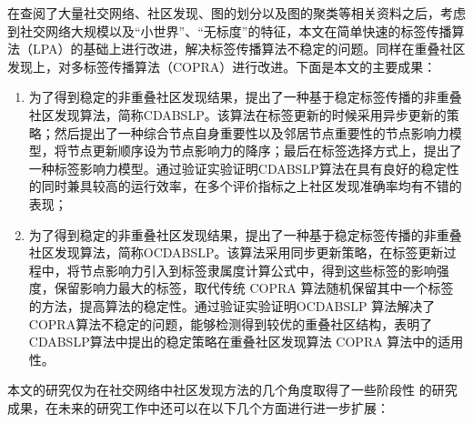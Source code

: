 

\begin{conclusion}


在查阅了大量社交网络、社区发现、图的划分以及图的聚类等相关资料之后，考虑到社交网络大规模以及“小世界”、“无标度”的特征，本文在简单快速的标签传播算法（LPA）的基础上进行改进，解决标签传播算法不稳定的问题。同样在重叠社区发现上，对多标签传播算法（COPRA）进行改进。下面是本文的主要成果：
\begin{enumerate}
    \item 为了得到稳定的非重叠社区发现结果，提出了一种基于稳定标签传播的非重叠社区发现算法，简称CDABSLP。该算法在标签更新的时候采用异步更新的策略；然后提出了一种综合节点自身重要性以及邻居节点重要性的节点影响力模型，将节点更新顺序设为节点影响力的降序；最后在标签选择方式上，提出了一种标签影响力模型。通过验证实验证明CDABSLP算法在具有良好的稳定性的同时兼具较高的运行效率，在多个评价指标之上社区发现准确率均有不错的表现；
    \item 为了得到稳定的非重叠社区发现结果，提出了一种基于稳定标签传播的非重叠社区发现算法，简称OCDABSLP。该算法采用同步更新策略，在标签更新过程中，将节点影响力引入到标签隶属度计算公式中，得到这些标签的影响强度，保留影响力最大的标签，取代传统 COPRA 算法随机保留其中一个标签的方法，提高算法的稳定性。通过验证实验证明OCDABSLP 算法解决了COPRA算法不稳定的问题，能够检测得到较优的重叠社区结构，表明了CDABSLP算法中提出的稳定策略在重叠社区发现算法 COPRA 算法中的适用性。
\end{enumerate}

本文的研究仅为在社交网络中社区发现方法的几个角度取得了一些阶段性
的研究成果，在未来的研究工作中还可以在以下几个方面进行进一步扩展：


\end{conclusion}
